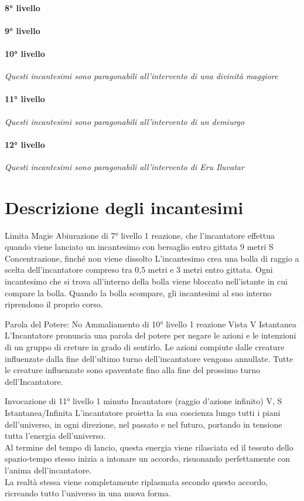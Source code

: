 \paragraph{8° livello}
\paragraph{9° livello}
\paragraph{10° livello} \textit{Questi incantesimi sono paragonabili all'intervento di una divinità maggiore}
\paragraph{11° livello} \textit{Questi incantesimi sono paragonabili all'intervento di un demiurgo}
\paragraph{12° livello} \textit{Questi incantesimi sono paragonabili all'intervento di Eru Iluvatar}

\section{Descrizione degli incantesimi}

\DndSpellHeader%
  {Limita Magie}
  {Abiurazione di 7° livello}
  {1 reazione, che l'incantatore effettua quando viene lanciato un incantesimo con bersaglio entro gittata}
  {9 metri}
  {S}
  {Concentrazione, finché non viene dissolto}
L'incantesimo crea una bolla di raggio a scelta dell'incantatore compreso tra 0,5 metri e 3 metri entro gittata. Ogni incantesimo che si trova all'interno della bolla viene bloccato nell'istante in cui compare la bolla. Quando la bolla scompare, gli incantesimi al suo interno riprendono il proprio corso.

\DndSpellHeader%
  {Parola del Potere: No}
  {Ammaliamento di 10° livello}
  {1 reazione}
  {Vista}
  {V}
  {Istantanea}
L'Incantatore pronuncia una parola del potere per negare le azioni e le intenzioni di un gruppo di creture in grado di sentirlo.
Le azioni compiute dalle creature influenzate dalla fine dell'ultimo turno dell'incantatore vengono annullate.
Tutte le creature influenzate sono spaventate fino alla fine del prossimo turno dell'Incantatore.

{Invocazione di 11° livello}
{1 minuto}
{Incantatore (raggio d'azione infinito)}
{V, S}
{Istantanea/Infinita}
L'incantatore proietta la sua coscienza lungo tutti i piani dell'universo, in ogni direzione, nel passato e nel futuro, portando in tensione tutta l'energia dell'universo. \\ Al termine del tempo di lancio, questa energia viene rilasciata ed il tessuto dello spazio-tempo stesso inizia a intonare un accordo, risuonando perfettamente con l'anima dell'incantatore. \\ La realtà stessa viene completamente riplasmata secondo questo accordo, ricreando tutto l'universo in una nuova forma.

